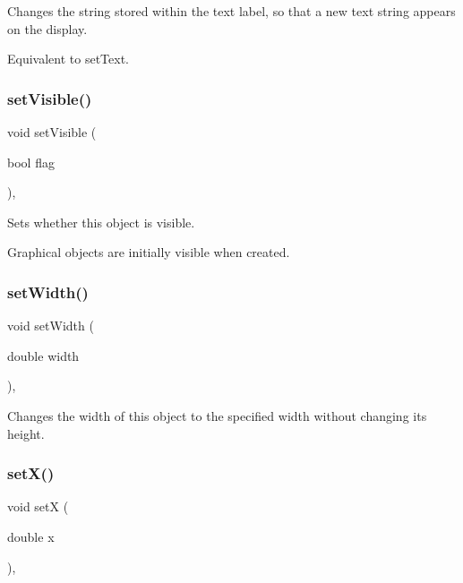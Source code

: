 Changes the string stored within the text label, so that a new text string appears on the display. 

Equivalent to set\+Text. \mbox{\label{classGObject_a88203f28224315d9f4471212f4af8ed3}} 
\subsubsection{\texorpdfstring{set\+Visible()}{setVisible()}}
{\footnotesize\ttfamily void set\+Visible (\begin{DoxyParamCaption}\item[{bool}]{flag }\end{DoxyParamCaption})\hspace{0.3cm}{\ttfamily [virtual]}, {\ttfamily [inherited]}}



Sets whether this object is visible. 

Graphical objects are initially visible when created. \mbox{\label{classGObject_aa3f3fba4cb131baa8696ba01e3bceca1}} 
\subsubsection{\texorpdfstring{set\+Width()}{setWidth()}}
{\footnotesize\ttfamily void set\+Width (\begin{DoxyParamCaption}\item[{double}]{width }\end{DoxyParamCaption})\hspace{0.3cm}{\ttfamily [virtual]}, {\ttfamily [inherited]}}



Changes the width of this object to the specified width without changing its height. 

\mbox{\label{classGObject_a9c18fcc579333bf9653d13ad2b372e39}} 
\subsubsection{\texorpdfstring{set\+X()}{setX()}}
{\footnotesize\ttfamily void setX (\begin{DoxyParamCaption}\item[{double}]{x }\end{DoxyParamCaption})\hspace{0.3cm}{\ttfamily [virtual]}, {\ttfamily [inherited]}}



